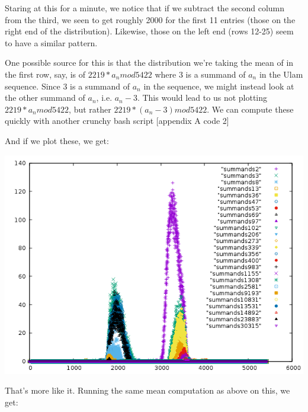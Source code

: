\documentclass{article}
\theoremstyle{definition}
\theoremstyle{remark}
\numberwithin{equation}{section}
\begin{document}
{Staring at this for a minute, we notice that if we subtract the second
column from the third, we seen to get roughly 2000 for the first 11
entries (those on the right end of the distribution).  Likewise, those
on the left end (rows 12-25) seem to have a similar pattern.

One possible source for this is that the distribution we're taking the
mean of in the first row, say, is of $2219*a_n mod 5422$ where 3 is a
summand of $a_n$ in the Ulam sequence.  Since 3 is a summand of $a_n$ in
the sequence, we might instead look at the other summand of $a_n$,
i.e. $a_n - 3$.  This would lead to us not plotting $2219*a_n mod 5422$,
but rather $2219*(a_n-3) mod 5422$.  We can compute these quickly with
another crunchy bash script [appendix A code 2]

And if we plot these, we get: 

\includegraphics[scale=0.5]{../figs/shifted_summands_mod_5422.png}

That's more like it.  Running the same mean computation as above on this, we get:

}
\end{document}
